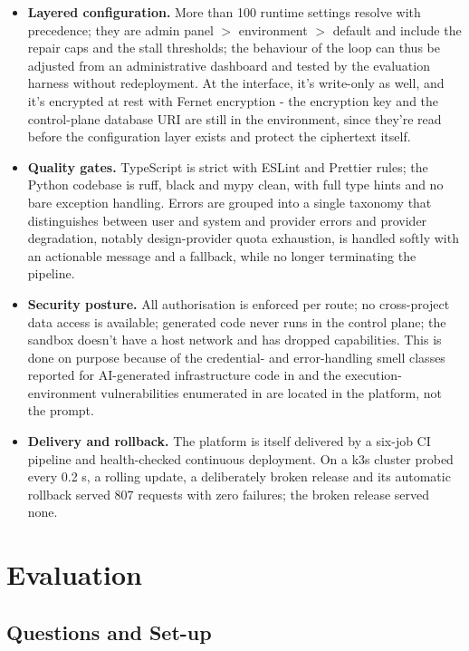 \documentclass[pdflatex,sn-mathphys-num]{sn-jnl}%
\theoremstyle{thmstyleone}%
\theoremstyle{thmstyletwo}%
\theoremstyle{thmstylethree}%
\begin{document}
\begin{itemize}
\item \textbf{Layered configuration.} More than 100 runtime settings resolve with precedence; they are admin panel $>$ environment $>$ default and include the repair caps and the stall thresholds; the behaviour of the loop can thus be adjusted from an administrative dashboard and tested by the evaluation harness without redeployment. At the interface, it's write-only as well, and it's encrypted at rest with Fernet encryption - the encryption key and the control-plane database URI are still in the environment, since they're read before the configuration layer exists and protect the ciphertext itself.
\item \textbf{Quality gates.} TypeScript is strict with ESLint and Prettier rules; the Python codebase is ruff, black and mypy clean, with full type hints and no bare exception handling. Errors are grouped into a single taxonomy that distinguishes between user and system and provider errors and provider degradation, notably design-provider quota exhaustion, is handled softly with an actionable message and a fallback, while no longer terminating the pipeline.
\item \textbf{Security posture.} All authorisation is enforced per route; no cross-project data access is available; generated code never runs in the control plane; the sandbox doesn't have a host network and has dropped capabilities. This is done on purpose because of the credential- and error-handling smell classes reported for AI-generated infrastructure code in \cite{r04ghammam} and the execution-environment vulnerabilities enumerated in \cite{r24rabin} are located in the platform, not the prompt.
\item \textbf{Delivery and rollback.} The platform is itself delivered by a six-job CI pipeline and health-checked continuous deployment. On a k3s cluster probed every 0.2 s, a rolling update, a deliberately broken release and its automatic rollback served 807 requests with zero failures; the broken release served none.
\end{itemize}

\section{Evaluation}\label{sec8}

\subsection{Questions and Set-up}\label{sec8.1}
\end{document}
